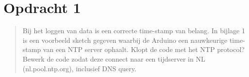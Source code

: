 \documentclass[12pt]{article}
\begin{document}
\clearpage

{}
\section*{Opdracht 1}
\begin{quote}
Bij het loggen van data is een correcte time-stamp van belang. In bijlage 1 is een voorbeeld sketch gegeven waarbij de Arduino een nauwkeurige time-stamp van een NTP server ophaalt. Klopt de code met het NTP protocol? Bewerk de code zodat deze connect naar een tijdserver in NL (nl.pool.ntp.org), inclusief DNS query.
\end{quote}

\newpage
\end{document}
